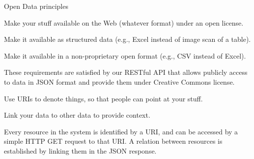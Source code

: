 \begin{frame}[allowframebreaks]{Open Data principles}
	\begin{block}{\faStar\faStarO\faStarO\faStarO\faStarO}
		Make your stuff available on the Web (whatever format) under an open
		license.
	\end{block}
	\begin{block}{\faStar\faStar\faStarO\faStarO\faStarO}
		Make it available as structured data (e.g., Excel instead of image scan
		of a table).
	\end{block}
	\begin{block}{\faStar\faStar\faStar\faStarO\faStarO}
		Make it available in a non-proprietary open format (e.g., CSV instead of
		Excel).
	\end{block}
	These requirements are satisfied by our RESTful API that allows
	publicly access to data in JSON format and provide them under Creative
	Commons license.

	\begin{block}{\faStar\faStar\faStar\faStar\faStarO}
		Use URIs to denote things, so that people can point at your stuff.
	\end{block}
	\begin{block}{\faStar\faStar\faStar\faStar\faStar}
		Link your data to other data to provide context.
	\end{block}
	Every resource in the system is identified by a URI, and can be accessed
	by a simple HTTP GET request to that URI. A relation between resources
	is established by linking them in the JSON response.
\end{frame}
